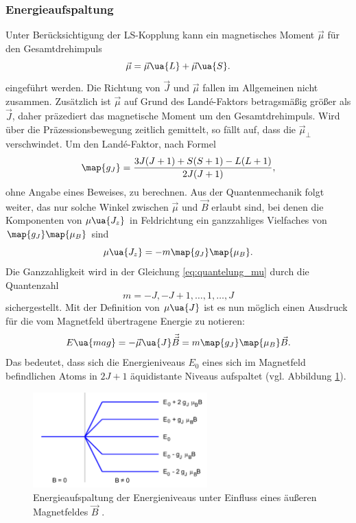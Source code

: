 \subsubsection{Energieaufspaltung}
Unter Berücksichtigung der LS-Kopplung kann ein magnetisches Moment $\vec{\mu}$ für den Gesamtdrehimpuls %
\begin{equation*}
  \vec{\mu}=\vec{\mu}\ua{L} + \vec{\mu}\ua{S}.
\end{equation*}
eingeführt werden.
Die Richtung von $\vec{J}$ und $\vec{\mu}$ fallen im Allgemeinen nicht zusammen. Zusätzlich ist
$\vec{\mu}$ auf Grund des Landé-Faktors betragsmäßig größer als $\vec{J}$, daher präzediert das magnetische Moment um den Gesamtdrehimpuls. %
Wird über die Präzessionsbewegung zeitlich gemittelt, so fällt auf, dass die $\vec{\mu}_{\perp}$ verschwindet. %
Um den Landé-Faktor, nach Formel %
\begin{equation}
  \label{eq:lande_faktor}
  \map{g_J}=\frac{3J(J+1)+S(S+1)-L(L+1)}{2J(J+1)},  %
\end{equation}
ohne Angabe eines Beweises, zu berechnen.
Aus der Quantenmechanik folgt weiter, das nur solche Winkel zwischen $\vec{\mu}$ und %
$\vec{B}$ erlaubt sind, bei denen die Komponenten von $\mu\ua{J_z}$ in Feldrichtung ein ganzzahliges Vielfaches von
$\map{g_J}\map{\mu_B}$ sind
\begin{equation}
  \label{eq:quantelung_mu}
  \mu\ua{J_z}=-m\map{g_J}\map{\mu_B}.
\end{equation}
Die Ganzzahligkeit wird in der Gleichung \eqref{eq:quantelung_mu} durch die Quantenzahl
\begin{equation*}
m=-J,-J+1,\dots,1,\dots, J
\end{equation*}
sichergestellt.
Mit der Definition von $\mu\ua{J}$ ist es nun möglich einen Ausdruck für die vom Magnetfeld übertragene Energie
zu notieren:
\begin{equation}
  \label{eq:energie_mag}
  E\ua{mag}=-\vec{\mu}\ua{J}\vec{\vec{B}}=m\map{g_J}\map{\mu_B}\vec{B}.
\end{equation}
Das bedeutet, dass sich die Energieniveaus $E_0$ eines sich im Magnetfeld befindlichen Atoms
in $2J+1$ äquidistante Niveaus aufspaltet (vgl. Abbildung \ref{fig: energie_magnet}).
\FloatBarrier
\begin{figure}[h]
  \centering
  \includegraphics[width=0.6\textwidth]{pics/energieaufspaltung_magnetfeld.png}
  \caption{Energieaufspaltung der Energieniveaus unter Einfluss eines äußeren Magnetfeldes $\vec{B}$ \cite{anleitung27}.}
  \label{fig: energie_magnet}
\end{figure}
\FloatBarrier

